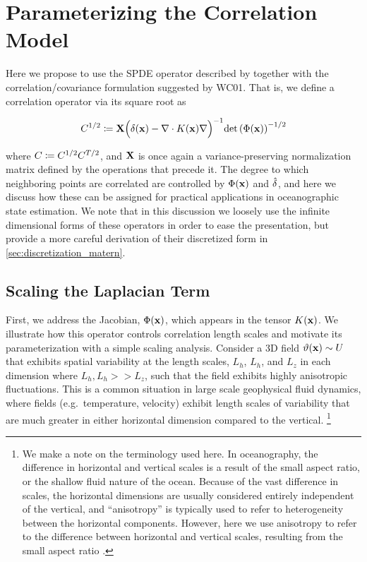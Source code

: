 \section{Parameterizing the Correlation Model}
\label{sec:matern_operator}

Here we propose to use the SPDE operator described by \citet{RSSB:RSSB777}
together with the correlation/covariance formulation suggested by WC01.
That is, we define a correlation operator via its square root as
\begin{linenomath*}\begin{equation}
    C^{1/2} \coloneqq \mathbf{X}
    \Big(\delta(\mathbf{x})- \nabla\cdot K(\mathbf{x})\nabla\Big)^{-1}
    \text{det}\left(\Phi(\mathbf{x})\right)^{-1/2}
\end{equation}\end{linenomath*}
where $C \coloneqq C^{1/2}C^{T/2}$, and $\mathbf{X}$ is
once again a variance-preserving normalization matrix defined by the operations
that precede it.
The degree to which neighboring points are correlated are controlled by
$\Phi(\mathbf{x})$ and $\hat{\delta}$, and here we discuss how these can be assigned for
practical applications in oceanographic state estimation.
We note that in this discussion we loosely use the infinite dimensional forms of
these operators in order to ease the presentation, but provide a more careful
derivation of their discretized form in \cref{sec:discretization_matern}.

\subsection{Scaling the Laplacian Term}
\label{ssec:scaling_laplacian}

First, we address the Jacobian, $\Phi(\mathbf{x})$, which appears in the tensor
$K(\mathbf{x})$.
We illustrate how this operator controls correlation length scales and
motivate its parameterization with a simple scaling analysis.
Consider a 3D field $\vartheta(\mathbf{x})\sim U$ that exhibits spatial variability at the
length scales, $L_h$, $L_h$, and $L_z$ in each dimension
where $L_h, L_h >> L_z$, such that the field exhibits highly
anisotropic fluctuations.
This is a common situation in large scale geophysical fluid
dynamics, where fields (e.g.\ temperature, velocity) exhibit length scales of
variability that are much greater in either horizontal dimension compared to the
vertical.
\footnote{
    We make a note on the terminology used here.
    In oceanography, the difference in horizontal and vertical scales
    is a result of the small aspect ratio, or the shallow fluid nature of the ocean.
    Because of the vast difference in scales, the horizontal dimensions are usually
    considered entirely independent of the vertical, and ``anisotropy'' is typically
    used to refer to heterogeneity between the horizontal components.
    However, here we use anisotropy to refer to the difference between horizontal
    and vertical scales, resulting from the small aspect ratio \citep{vallis2006}.
}


